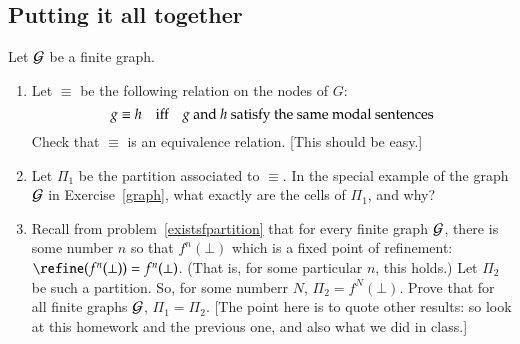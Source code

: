 \documentclass[12pt]{article}
\begin{document}
\subsection{Putting it all together}
Let ${\cal G}$ be a finite graph.  
\begin{enumerate}
\item Let $\equiv$ be the following  relation on the nodes of $G$:
\[ g \equiv h \quad \mbox{iff}\quad \mbox{$g$ and $h$ satisfy the same modal sentences} \]
Check that $\equiv$ is an equivalence relation.  [This should be easy.]
\item Let $\Pi_{1}$ be the partition associated to $\equiv$.   
In the special example of the graph ${\cal G}$ in Exercise~\ref{graph}, what  exactly are the cells of $\Pi_1$, and why?
\item
  Recall from 
problem~\ref{existsfpartition} that 
for every finite graph ${\cal G}$, 
there is some number $n$ so that  $f^n(\bot)$ which is a fixed point of refinement:
$\refine(f^n(\bot)) = f^n(\bot)$.  (That is, for some particular $n$, this holds.)   Let $\Pi_2$ be such a partition.
So, for some numberr $N$, $\Pi_2 =  f^N(\bot)$. 
 Prove that for all finite graphs ${\cal G}$, $\Pi_1 = \Pi_2$.
 [The point here is to quote other results: so look at this homework and the previous one, and also what we did in class.]
 

 
\end{enumerate} 
\end{document}

